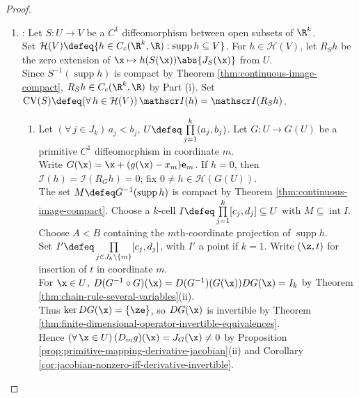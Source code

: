 \begin{theorem}
\begin{proof}
\begin{enumerate}[label=(\roman*)]
Set $L\defeq T^{-1}(K)$ and $\rho(\x)\defeq f(T(\x))\abs{J_T(\x)}$ on $E$. Then $L$ is compact by Theorem \ref{thm:continuous-image-compact}, $\rho\in C(E)$, and $\rho=0$ on $E\setminus L$.\\
Thus the zero extension $\widetilde\rho$ belongs to $C_c(\R^k,\R)$ by the zero-extension argument above. For $u\in C_c(\R^k,\R)$, set $\mathscr I(u)\defeq\int_{\R^k}u$.
\item {}: Let $S:U\to V$ be a $C^1$ diffeomorphism between open subsets of $\R^k$.\\
Set $\mathcal H(V)\defeq\{h\in C_c(\R^k,\R):\operatorname{supp}h\subseteq V\}$. For $h\in\mathcal H(V)$, let $R_Sh$ be the zero extension of $\x\mapsto h(S(\x))\abs{J_S(\x)}$ from $U$.\\
Since $S^{-1}(\operatorname{supp}h)$ is compact by Theorem \ref{thm:continuous-image-compact}, $R_Sh\in C_c(\R^k,\R)$ by Part (i). Set $\operatorname{CV}(S)\defeq(\forall\,h\in\mathcal H(V))\,\mathscr I(h)=\mathscr I(R_Sh)$.
\begin{enumerate}[label=(\alph*)]
\setlength{\itemsep}{0pt}
\item Let $(\forall\,j\in J_k)\,a_j<b_j$, $U\defeq\prod\limits_{j=1}^{k}(a_j,b_j)$. Let $G:U\to G(U)$ be a primitive $C^1$ diffeomorphism in coordinate $m$.\\
Write $G(\x)=\x+(g(\x)-x_m)\mathbf e_m$. If $h=0$, then $\mathscr I(h)=\mathscr I(R_Gh)=0$; fix $0\neq h\in\mathcal H(G(U))$.\\
The set $M\defeq G^{-1}(\operatorname{supp}h)$ is compact by Theorem \ref{thm:continuous-image-compact}. Choose a $k$-cell $I\defeq\prod\limits_{j=1}^{k}[c_j,d_j]\subseteq U$ with $M\subseteq\operatorname{int}I$.\\
Choose $A<B$ containing the $m$th-coordinate projection of $\operatorname{supp}h$.\\
Set $I'\defeq\prod\limits_{j\in J_k\setminus\{m\}}[c_j,d_j]$, with $I'$ a point if $k=1$. Write $(\z,t)$ for insertion of $t$ in coordinate $m$.\\
For $\x\in U$, $D(G^{-1}\circ G)(\x)=D(G^{-1})(G(\x))DG(\x)=I_k$ by Theorem \ref{thm:chain-rule-several-variables}(ii).\\
Thus $\ker DG(\x)=\{\ze\}$, so $DG(\x)$ is invertible by Theorem \ref{thm:finite-dimensional-operator-invertible-equivalences}.\\
Hence $(\forall\,\x\in U)\,(D_mg)(\x)=J_G(\x)\neq0$ by Proposition \ref{prop:primitive-mapping-derivative-jacobian}(ii) and Corollary \ref{cor:jacobian-nonzero-iff-derivative-invertible}.\\

\end{enumerate}
\end{enumerate}
\end{proof}
\end{theorem}
